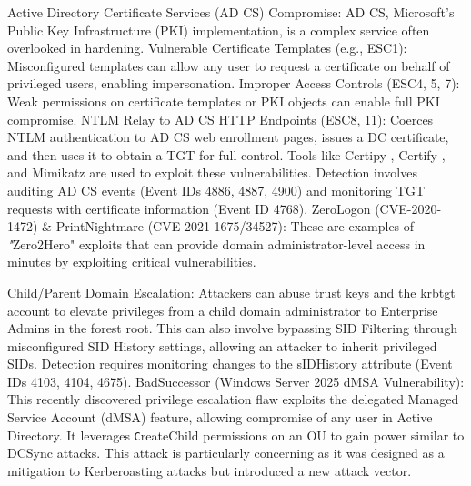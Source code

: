 Active Directory Certificate Services (AD CS) Compromise:  AD CS, Microsoft's Public Key Infrastructure (PKI) implementation, is a complex service often overlooked in hardening.
Vulnerable Certificate Templates (e.g., ESC1):  Misconfigured templates can allow any user to request a certificate on behalf of privileged users, enabling impersonation.
Improper Access Controls (ESC4, 5, 7):  Weak permissions on certificate templates or PKI objects can enable full PKI compromise.
NTLM Relay to AD CS HTTP Endpoints (ESC8, 11):  Coerces NTLM authentication to AD CS web enrollment pages, issues a DC certificate, and then uses it to obtain a TGT for full control.
Tools like   Certipy ,   Certify , and   Mimikatz  are used to exploit these vulnerabilities. Detection involves auditing AD CS events (Event IDs 4886, 4887, 4900) and monitoring TGT requests with certificate information (Event ID 4768).                                                                                            
ZeroLogon (CVE-2020-1472) \& PrintNightmare (CVE-2021-1675/34527):  These are examples of \textit "Zero2Hero"  exploits that can provide domain administrator-level access in minutes by exploiting critical vulnerabilities.

Child/Parent Domain Escalation:  Attackers can abuse trust keys and the krbtgt account to elevate privileges from a child domain administrator to Enterprise Admins in the forest root. This can also involve bypassing SID Filtering through misconfigured SID History settings, allowing an attacker to inherit privileged SIDs. Detection requires monitoring changes to the sIDHistory attribute (Event IDs 4103, 4104, 4675).
BadSuccessor (Windows Server 2025 dMSA Vulnerability):  This recently discovered privilege escalation flaw exploits the delegated Managed Service Account (dMSA) feature, allowing compromise of any user in Active Directory. It leverages \texttt CreateChild  permissions on an OU to gain power similar to DCSync attacks. This attack is particularly concerning as it was designed as a mitigation to Kerberoasting attacks but introduced a new attack vector.

